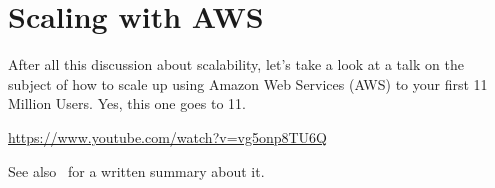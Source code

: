 




\section*{Scaling with AWS}

After all this discussion about scalability, let's take a look at a talk on the subject of how to scale up using Amazon Web Services (AWS) to your first 11 Million Users. Yes, this one goes to 11.


\begin{center}
\url{https://www.youtube.com/watch?v=vg5onp8TU6Q}
\end{center}

See also~\cite{awsscale} for a written summary about it.




